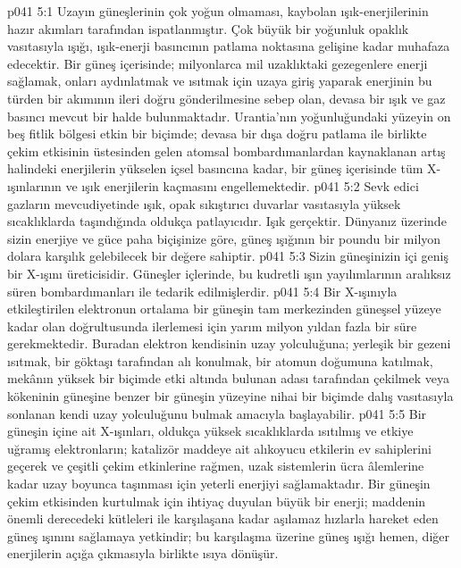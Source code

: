\vs p041 5:1 Uzayın güneşlerinin çok yoğun olmaması, kaybolan ışık\hyp{}enerjilerinin hazır akımları tarafından ispatlanmıştır. Çok büyük bir yoğunluk opaklık vasıtasıyla ışığı, ışık\hyp{}enerji basıncının patlama noktasına gelişine kadar muhafaza edecektir. Bir güneş içerisinde; milyonlarca mil uzaklıktaki gezegenlere enerji sağlamak, onları aydınlatmak ve ısıtmak için uzaya giriş yaparak enerjinin bu türden bir akımının ileri doğru gönderilmesine sebep olan, devasa bir ışık ve gaz basıncı mevcut bir halde bulunmaktadır. Urantia’nın yoğunluğundaki yüzeyin on beş fitlik bölgesi etkin bir biçimde; devasa bir dışa doğru patlama ile birlikte çekim etkisinin üstesinden gelen atomsal bombardımanlardan kaynaklanan artış halindeki enerjilerin yükselen içsel basıncına kadar, bir güneş içerisinde tüm X\hyp{}ışınlarının ve ışık enerjilerin kaçmasını engellemektedir.
\vs p041 5:2 Sevk edici gazların mevcudiyetinde ışık, opak sıkıştırıcı duvarlar vasıtasıyla yüksek sıcaklıklarda taşındığında oldukça patlayıcıdır. Işık gerçektir. Dünyanız üzerinde sizin enerjiye ve güce paha biçişinize göre, güneş ışığının bir poundu bir milyon dolara karşılık gelebilecek bir değere sahiptir.
\vs p041 5:3 Sizin güneşinizin içi geniş bir X\hyp{}ışını üreticisidir. Güneşler içlerinde, bu kudretli ışın yayılımlarının aralıksız süren bombardımanları ile tedarik edilmişlerdir.
\vs p041 5:4 Bir X\hyp{}ışınıyla etkileştirilen elektronun ortalama bir güneşin tam merkezinden güneşsel yüzeye kadar olan doğrultusunda ilerlemesi için yarım milyon yıldan fazla bir süre gerekmektedir. Buradan elektron kendisinin uzay yolculuğuna; yerleşik bir gezeni ısıtmak, bir göktaşı tarafından alı konulmak, bir atomun doğumuna katılmak, mekânın yüksek bir biçimde etki altında bulunan adası tarafından çekilmek veya kökeninin güneşine benzer bir güneşin yüzeyine nihai bir biçimde dalış vasıtasıyla sonlanan kendi uzay yolculuğunu bulmak amacıyla başlayabilir.
\vs p041 5:5 Bir güneşin içine ait X\hyp{}ışınları, oldukça yüksek sıcaklıklarda ısıtılmış ve etkiye uğramış elektronların; katalizör maddeye ait alıkoyucu etkilerin ev sahiplerini geçerek ve çeşitli çekim etkinlerine rağmen, uzak sistemlerin ücra âlemlerine kadar uzay boyunca taşınması için yeterli enerjiyi sağlamaktadır. Bir güneşin çekim etkisinden kurtulmak için ihtiyaç duyulan büyük bir enerji; maddenin önemli derecedeki kütleleri ile karşılaşana kadar aşılamaz hızlarla hareket eden güneş ışınını sağlamaya yetkindir; bu karşılaşma üzerine güneş ışığı hemen, diğer enerjilerin açığa çıkmasıyla birlikte ısıya dönüşür.
